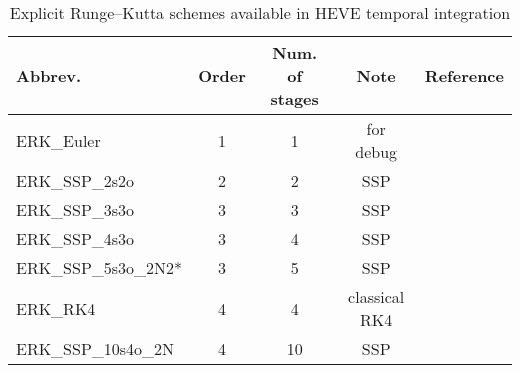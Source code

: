 \begin{table}[t]
\caption{Explicit Runge--Kutta schemes available in HEVE temporal integration}
\begin{tabular}{l|cccc}
\hline
Abbrev. & Order & Num. of stages & Note & Reference \\
\hline
ERK\_Euler & 1 & 1 & for debug & \\
\hline
ERK\_SSP\_2s2o & 2 & 2 & SSP & \cite{SHU1988439} \\
\hline
ERK\_SSP\_3s3o & 3 & 3 & SSP & \cite{SHU1988439} \\
ERK\_SSP\_4s3o & 3 & 4 & SSP & \\
ERK\_SSP\_5s3o\_2N2* & 3 & 5 & SSP & \cite{higueras2019new} \\
\hline
ERK\_RK4 & 4 & 4 & classical RK4 & \\
ERK\_SSP\_10s4o\_2N & 4 & 10 & SSP & \cite{Ketcheson2008RK4o10s} \\
\hline
\end{tabular}
\label{tb:HEVE_temporal_integ_choice}
\end{table}

